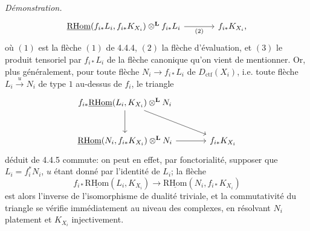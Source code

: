 \documentclass[11pt]{article}
\newenvironment{prooftext}[1][Proof]{\par\noindent\emph{#1.}\ }{\par\medskip}
\providecommand{\RHom}{\mathrm{RHom}}
\providecommand{\uRHom}{\underline{\RHom}}
\providecommand{\Dctf}{D_{\mathrm{ctf}}}
\providecommand{\Dctf}{D_{\mathrm{ctf}}}
\providecommand{\RHom}{\mathrm{RHom}}
\providecommand{\RHom}{\mathrm R\mathcal{H}om}
\providecommand{\RHom}{\mathrm{RHom}}
\begin{document}
\begin{prooftext}[Démonstration]
\begin{equation}
\begin{tikzcd}[column sep=large,row sep=large]
\uRHom(f_{i*}L_i,f_{i*}K_{X_i})\otimes^{\mathbf L} f_{i*}L_i
 \arrow[r,"(2)"'] &
f_{i*}K_{X_i},
\end{tikzcd}
\end{equation}
où $(1)$ est la flèche $(1)$ de 4.4.4, $(2)$ la flèche d'évaluation, et $(3)$ le produit tensoriel par $f_{i*}L_i$ de la flèche canonique qu'on vient de mentionner. Or, plus généralement, pour toute flèche $N_i\longrightarrow f_{i*}L_i$ de $\Dctf(X_i)$, i.e. toute flèche $L_i\xrightarrow{u}N_i$ de type $1$ au-dessus de $f_i$, le triangle
\[
\begin{tikzcd}[column sep=large,row sep=large]
f_{i*}\uRHom(L_i,K_{X_i})\otimes^{\mathbf L}N_i
 \arrow[dr] \arrow[d] & \\
\uRHom(N_i,f_{i*}K_{X_i})\otimes^{\mathbf L}N_i \arrow[r] &
f_{i*}K_{X_i}
\end{tikzcd}
\]
déduit de 4.4.5 commute: on peut en effet, par fonctorialité, supposer que $L_i=f_i^*N_i$, $u$ étant donné par l'identité de $L_i$; la flèche
\[
f_{i*}\uRHom(L_i,K_{X_i})\longrightarrow\uRHom(N_i,f_{i*}K_{X_i})
\]
est alors l'inverse de l'isomorphisme de dualité triviale, et la commutativité du triangle se vérifie immédiatement au niveau des complexes, en résolvant $N_i$ platement et $K_{X_i}$ injectivement.


\end{prooftext}
\end{document}

